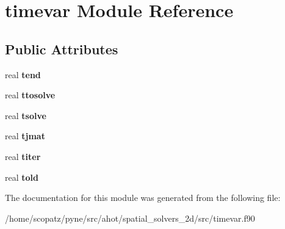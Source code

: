 \hypertarget{classtimevar}{\section{timevar Module Reference}
\label{classtimevar}
}
\subsection*{Public Attributes}
\begin{DoxyCompactItemize}
\item 
\hypertarget{classtimevar_a76d79f48bb04d878c1e66e9b09179181}{real {\bfseries tend}}\label{classtimevar_a76d79f48bb04d878c1e66e9b09179181}

\item 
\hypertarget{classtimevar_a154a69241e2e652b6a025650a2e903fe}{real {\bfseries ttosolve}}\label{classtimevar_a154a69241e2e652b6a025650a2e903fe}

\item 
\hypertarget{classtimevar_af710a2d90292754bfb0608b801729bc3}{real {\bfseries tsolve}}\label{classtimevar_af710a2d90292754bfb0608b801729bc3}

\item 
\hypertarget{classtimevar_ac142562bd2ebbe0b88a16b511c5a91d3}{real {\bfseries tjmat}}\label{classtimevar_ac142562bd2ebbe0b88a16b511c5a91d3}

\item 
\hypertarget{classtimevar_aa930b0267e96a826be5ba207aa8dae83}{real {\bfseries titer}}\label{classtimevar_aa930b0267e96a826be5ba207aa8dae83}

\item 
\hypertarget{classtimevar_af209975eea79e16faed013cf60c76a49}{real {\bfseries told}}\label{classtimevar_af209975eea79e16faed013cf60c76a49}

\end{DoxyCompactItemize}


The documentation for this module was generated from the following file\-:\begin{DoxyCompactItemize}
\item 
/home/scopatz/pyne/src/ahot/spatial\-\_\-solvers\-\_\-2d/src/timevar.\-f90\end{DoxyCompactItemize}
